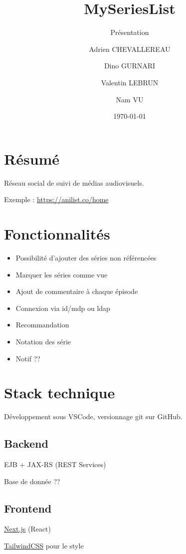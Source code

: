 \documentclass[headings=standardclasses,parskip=half]{scrartcl}
\title{MySeriesList}
\subtitle{Présentation}
\author{Adrien CHEVALLEREAU \and Dino GURNARI \and Valentin LEBRUN \and Nam VU}
\date{\today}
\begin{document}
\maketitle

\section*{Résumé}

Réseau social de suivi de médias audiovisuels.

Exemple : \url{https://anilist.co/home}

\section*{Fonctionnalités}

\begin{itemize}
    \item Possibilité d’ajouter des séries non référencées
    \item Marquer les séries comme vue
    \item Ajout de commentaire à chaque épisode
    \item Connexion via id/mdp ou ldap
    \item Recommandation
    \item Notation des série
    \item Notif ??
\end{itemize}

\section*{Stack technique}

Développement sous VSCode, versionnage git sur GitHub.

\subsection*{Backend}

EJB + JAX-RS (REST Services)

Base de donnée ??

\subsection*{Frontend}

\href{https://nextjs.org}{Next.js} (React)

\href{https://tailwindcss.com}{TailwindCSS} pour le style
\end{document}
